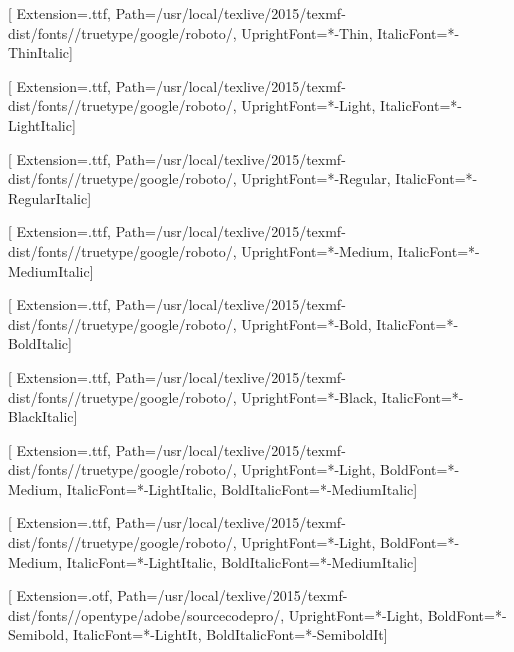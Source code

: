 
\newcommand{\fontdir}[0]{/usr/local/texlive/2015/texmf-dist/fonts/}
\newcommand{\robotodir}[0]{\fontdir/truetype/google/roboto/}
\newcommand{\sourcecodeprodir}[0]{\fontdir/opentype/adobe/sourcecodepro/}

\newfontfamily{}[
  Extension=.ttf,
  Path=\robotodir,
  UprightFont=*-Thin,
  ItalicFont=*-ThinItalic]

\newfontfamily{}[
  Extension=.ttf,
  Path=\robotodir,
  UprightFont=*-Light,
  ItalicFont=*-LightItalic]

\newfontfamily{}[
  Extension=.ttf,
  Path=\robotodir,
  UprightFont=*-Regular,
  ItalicFont=*-RegularItalic]

\newfontfamily{}[
  Extension=.ttf,
  Path=\robotodir,
  UprightFont=*-Medium,
  ItalicFont=*-MediumItalic]

\newfontfamily{}[
  Extension=.ttf,
  Path=\robotodir,
  UprightFont=*-Bold,
  ItalicFont=*-BoldItalic]

\newfontfamily{}[
  Extension=.ttf,
  Path=\robotodir,
  UprightFont=*-Black,
  ItalicFont=*-BlackItalic]

\setmainfont{Roboto}[
  Extension=.ttf,
  Path=\robotodir,
  UprightFont=*-Light,
  BoldFont=*-Medium,
  ItalicFont=*-LightItalic,
  BoldItalicFont=*-MediumItalic]

\setsansfont{Roboto}[
  Extension=.ttf,
  Path=\robotodir,
  UprightFont=*-Light,
  BoldFont=*-Medium,
  ItalicFont=*-LightItalic,
  BoldItalicFont=*-MediumItalic]

\setmonofont{SourceCodePro}[
  Extension=.otf,
  Path=\sourcecodeprodir,
  UprightFont=*-Light,
  BoldFont=*-Semibold,
  ItalicFont=*-LightIt,
  BoldItalicFont=*-SemiboldIt]

